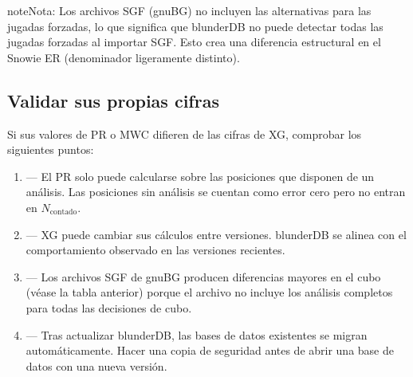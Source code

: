 \documentclass[letterpaper,10pt,spanish]{sphinxmanual}
\begin{document}
\begin{sphinxadmonition}{note}{Nota:}
\sphinxAtStartPar
Los archivos SGF (gnuBG) no incluyen las alternativas para las jugadas forzadas, lo que significa que blunderDB no puede detectar todas las jugadas forzadas al importar SGF. Esto crea una diferencia estructural en el Snowie ER (denominador ligeramente distinto).
\end{sphinxadmonition}


\subsection{Validar sus propias cifras}
\label{\detokenize{stats_parity:valider-vos-propres-chiffres}}
\sphinxAtStartPar
Si sus valores de PR o MWC difieren de las cifras de XG, comprobar los siguientes puntos:
\begin{enumerate}
%
\item {} 
\sphinxAtStartPar
{} — El PR solo puede calcularse sobre las posiciones que disponen de un análisis. Las posiciones sin análisis se cuentan como error cero pero no entran en \(N_\text{contado}\).

\item {} 
\sphinxAtStartPar
{} — XG puede cambiar sus cálculos entre versiones. blunderDB se alinea con el comportamiento observado en las versiones recientes.

\item {} 
\sphinxAtStartPar
{} — Los archivos SGF de gnuBG producen diferencias mayores en el cubo (véase la tabla anterior) porque el archivo no incluye los análisis completos para todas las decisiones de cubo.

\item {} 
\sphinxAtStartPar
{} — Tras actualizar blunderDB, las bases de datos existentes se migran automáticamente. Hacer una copia de seguridad antes de abrir una base de datos con una nueva versión.

\end{enumerate}
\end{document}

